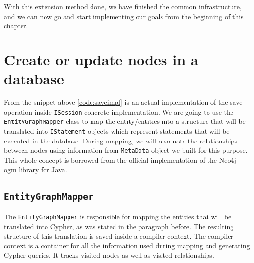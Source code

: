With this extension method done, we have finished the common infrastructure, and we can now go and start implementing our
goals from the beginning of this chapter.

\section{Create or update nodes in a database}


From the snippet above \ref{code:saveimpl} is an actual implementation of the save operation inside \texttt{ISession} concrete implementation.
We are going to use the \texttt{EntityGraphMapper} class to map the entity/entities into a structure that will be translated into
\texttt{IStatement} objects which represent statements that will be executed in the database. During mapping, we will also note the relationships between nodes
using information from \texttt{MetaData} object we built for this purpose. This whole concept is borrowed from
the official implementation of the Neo4j-\acrshort{ogm} library for Java.

\subsection{\texttt{EntityGraphMapper}}

The \texttt{EntityGraphMapper} is responsible for mapping the entities that will be translated into Cypher, as was stated in the paragraph before.
The resulting structure of this translation is saved inside a compiler context. The compiler context is a container for all the information
used during mapping and generating Cypher queries. It tracks visited nodes as well as visited relationships.

